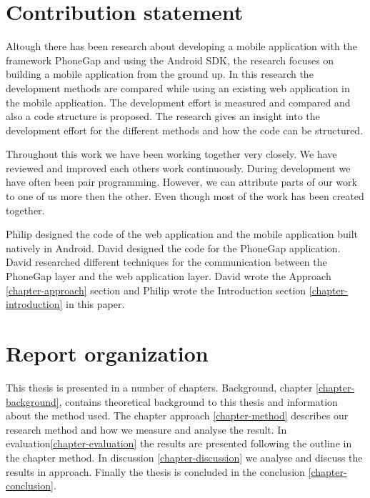 \section{Contribution statement}\label{section-contribution-statement}
Altough there has been research about developing a mobile application with the framework PhoneGap and using the Android SDK, the research focuses on building a mobile application from the ground up. In this research the development methods are compared while using an existing web application in the mobile application. The development effort is measured and compared and also a code structure is proposed. The research gives an insight into the development effort for the different methods and how the code can be structured.

Throughout this work we have been working together very closely. We have reviewed and improved each others work continuously. During development we have often been pair programming. However, we can attribute parts of our work to one of us more then the other. Even though most of the work has been created together. 

Philip designed the code of the web application and the mobile application built natively in Android. David designed the code for the PhoneGap application. David researched different techniques for the communication between the PhoneGap layer and the web application layer. David wrote the Approach \ref{chapter-approach} section and Philip wrote the Introduction section \ref{chapter-introduction} in this paper. 

\section{Report organization}\label{section-report-organization}
This thesis is presented in a number of chapters. Background, chapter \ref{chapter-background}, contains theoretical background to this thesis and information about the method used. The chapter approach \ref{chapter-method} describes our research method and how we measure and analyse the result. In evaluation\ref{chapter-evaluation} the results are presented following the outline in the chapter method. In discussion \ref{chapter-discussion} we analyse and discuss the results in approach. Finally the thesis is concluded in the conclusion \ref{chapter-conclusion}.